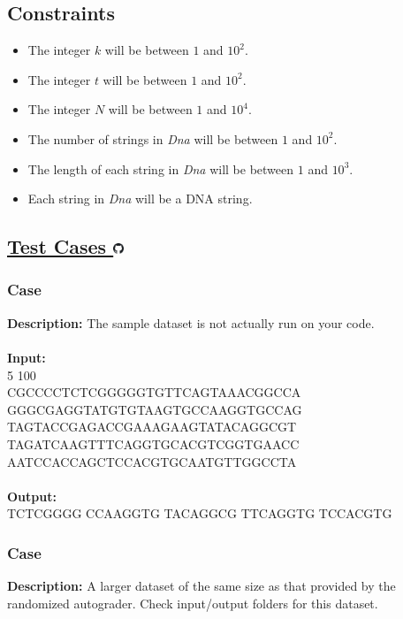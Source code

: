 \documentclass{article}
\newcommand{\code}[1]{{\fontfamily{pcr}\selectfont #1}}
\newcommand{\gitlogo}{\includegraphics[height=12.5]{c0/gitlogo.png}}
\begin{document}
\subsection*{Constraints}
\begin{itemize}
    \item The integer $k$ will be between $1$ and $10^2$.
    \item The integer $t$ will be between $1$ and $10^2$.
    \item The integer $N$ will be between $1$ and $10^4$.
    \item The number of strings in \emph{Dna} will be between $1$ and $10^2$.
    \item The length of each string in \emph{Dna} will be between $1$ and $10^3$.
    \item Each string in \emph{Dna} will be a DNA string.
\end{itemize}
\pagebreak

\subsection*{\href{https://github.com/rjeveloff/BA_problemregister/tree/main/test_cases/chapter_2/2G}{Test Cases \gitlogo}}
\subsubsection*{Case }
\hline \vspace{5}
\textbf{Description:} The sample dataset is not actually run on your code.\\ \\
\noindent \textbf{Input:}\\
\code{8 5 100\\CGCCCCTCTCGGGGGTGTTCAGTAAACGGCCA GGGCGAGGTATGTGTAAGTGCCAAGGTGCCAG\\TAGTACCGAGACCGAAAGAAGTATACAGGCGT TAGATCAAGTTTCAGGTGCACGTCGGTGAACC\\AATCCACCAGCTCCACGTGCAATGTTGGCCTA}\\ \\
\noindent \textbf{Output:}\\
\code{TCTCGGGG CCAAGGTG TACAGGCG TTCAGGTG TCCACGTG}

\subsubsection*{Case }
\hline \vspace{5}
\textbf{Description:} A larger dataset of the same size as that provided by the randomized autograder. Check input/output folders for this dataset.\\ \\
\pagebreak
\end{document}
